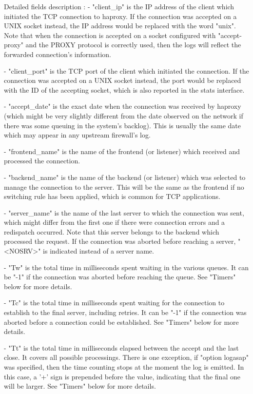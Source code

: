 Detailed fields description :
  - "client_ip" is the IP address of the client which initiated the TCP
    connection to haproxy. If the connection was accepted on a UNIX socket
    instead, the IP address would be replaced with the word "unix". Note that
    when the connection is accepted on a socket configured with "accept-proxy"
    and the PROXY protocol is correctly used, then the logs will reflect the
    forwarded connection's information.

  - "client_port" is the TCP port of the client which initiated the connection.
    If the connection was accepted on a UNIX socket instead, the port would be
    replaced with the ID of the accepting socket, which is also reported in the
    stats interface.

  - "accept_date" is the exact date when the connection was received by haproxy
    (which might be very slightly different from the date observed on the
    network if there was some queuing in the system's backlog). This is usually
    the same date which may appear in any upstream firewall's log.

  - "frontend_name" is the name of the frontend (or listener) which received
    and processed the connection.

  - "backend_name" is the name of the backend (or listener) which was selected
    to manage the connection to the server. This will be the same as the
    frontend if no switching rule has been applied, which is common for TCP
    applications.

  - "server_name" is the name of the last server to which the connection was
    sent, which might differ from the first one if there were connection errors
    and a redispatch occurred. Note that this server belongs to the backend
    which processed the request. If the connection was aborted before reaching
    a server, "<NOSRV>" is indicated instead of a server name.

  - "Tw" is the total time in milliseconds spent waiting in the various queues.
    It can be "-1" if the connection was aborted before reaching the queue.
    See "Timers" below for more details.

  - "Tc" is the total time in milliseconds spent waiting for the connection to
    establish to the final server, including retries. It can be "-1" if the
    connection was aborted before a connection could be established. See
    "Timers" below for more details.

  - "Tt" is the total time in milliseconds elapsed between the accept and the
    last close. It covers all possible processings. There is one exception, if
    "option logasap" was specified, then the time counting stops at the moment
    the log is emitted. In this case, a '+' sign is prepended before the value,
    indicating that the final one will be larger. See "Timers" below for more
    details.

